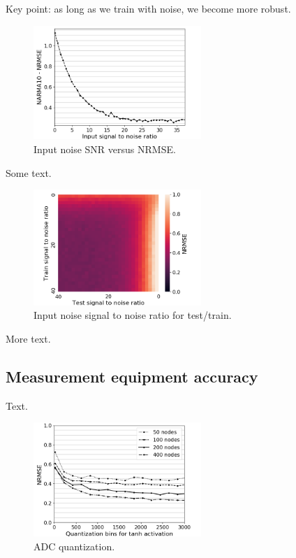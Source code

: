 Key point: as long as we train with noise, we become more robust.

\begin{figure}[H]
  \centering
  \includegraphics[width=2.5in]{img/input_noise_snr.png}
  \caption{
    Input noise SNR versus NRMSE.
  }
  \label{input_noise_snr}
\end{figure}

Some text.

\begin{figure}[H]
  \centering
  \includegraphics[width=2.5in]{img/input_noise_heatmap.png}
  \caption{
    Input noise signal to noise ratio for test/train.
  }
  \label{input_noise_heatmap}
\end{figure}

More text.

\subsection{Measurement equipment accuracy}

Text.

\begin{figure}[H]
  \centering
  \includegraphics[width=2.5in]{img/adc_quantization.png}
  \caption{
    ADC quantization.
  }
  \label{adc_quantization}
\end{figure}

